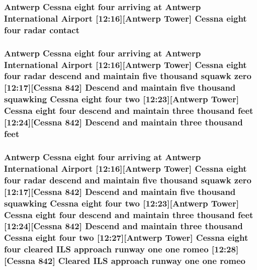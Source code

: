 \subsubsection[{\texorpdfstring{contact}{contact}}]{\setlength{\rightskip}{0pt plus 5cm}Antwerp {\bf Cessna} eight four arriving at Antwerp International {\bf Airport} \mbox{[}12\+:16\mbox{]}\mbox{[}Antwerp {\bf Tower}\mbox{]} {\bf Cessna} eight four radar contact}\hypertarget{happyDay1ATC_8txt_aabccce409c3b74e74ea0c068d4a73f10}{}\label{happyDay1ATC_8txt_aabccce409c3b74e74ea0c068d4a73f10}
\subsubsection[{\texorpdfstring{feet}{feet}}]{\setlength{\rightskip}{0pt plus 5cm}Antwerp {\bf Cessna} eight four arriving at Antwerp International {\bf Airport} \mbox{[}12\+:16\mbox{]}\mbox{[}Antwerp {\bf Tower}\mbox{]} {\bf Cessna} eight four radar descend and maintain five {\bf thousand} squawk {\bf zero} \mbox{[}12\+:17\mbox{]}\mbox{[}{\bf Cessna} 842\mbox{]} Descend and maintain five {\bf thousand} {\bf squawking} {\bf Cessna} eight four {\bf two} \mbox{[}12\+:23\mbox{]}\mbox{[}Antwerp {\bf Tower}\mbox{]} {\bf Cessna} eight four descend and maintain three {\bf thousand} feet \mbox{[}12\+:24\mbox{]}\mbox{[}{\bf Cessna} 842\mbox{]} Descend and maintain three {\bf thousand} feet}\hypertarget{happyDay1ATC_8txt_adb5a296986a5b6019ec88f520f243c26}{}\label{happyDay1ATC_8txt_adb5a296986a5b6019ec88f520f243c26}
\subsubsection[{\texorpdfstring{romeo}{romeo}}]{\setlength{\rightskip}{0pt plus 5cm}Antwerp {\bf Cessna} eight four arriving at Antwerp International {\bf Airport} \mbox{[}12\+:16\mbox{]}\mbox{[}Antwerp {\bf Tower}\mbox{]} {\bf Cessna} eight four radar descend and maintain five {\bf thousand} squawk {\bf zero} \mbox{[}12\+:17\mbox{]}\mbox{[}{\bf Cessna} 842\mbox{]} Descend and maintain five {\bf thousand} {\bf squawking} {\bf Cessna} eight four {\bf two} \mbox{[}12\+:23\mbox{]}\mbox{[}Antwerp {\bf Tower}\mbox{]} {\bf Cessna} eight four descend and maintain three {\bf thousand} {\bf feet} \mbox{[}12\+:24\mbox{]}\mbox{[}{\bf Cessna} 842\mbox{]} Descend and maintain three {\bf thousand} {\bf Cessna} eight four {\bf two} \mbox{[}12\+:27\mbox{]}\mbox{[}Antwerp {\bf Tower}\mbox{]} {\bf Cessna} eight four cleared I\+LS approach runway {\bf one} {\bf one} romeo \mbox{[}12\+:28\mbox{]}\mbox{[}{\bf Cessna} 842\mbox{]} Cleared I\+LS approach runway {\bf one} {\bf one} romeo}\hypertarget{happyDay1ATC_8txt_a06b6f6d56485147ded0d7b2537c6538c}{}\label{happyDay1ATC_8txt_a06b6f6d56485147ded0d7b2537c6538c}
